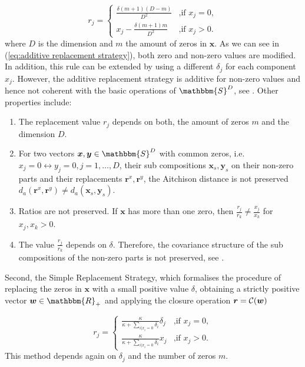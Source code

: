 \begin{equation}
r_j = 
\begin{cases}
\frac{\delta(m+1)(D-m)}{D^2} & \text{,if } x_j=0, \\
x_j - \frac{\delta(m+1)m}{D^2} & \text{,if } x_j>0.
\end{cases}
\label{eq:additive replacement strategy}
\end{equation}
%
where $D$ is the dimension and $m$ the amount of zeros in $\bm{x}$. 
As we can see in (\ref{eq:additive replacement strategy}), both zero and non-zero values are modified. In addition, this rule can be extended by using a different $\delta_j$ for each component $x_j$. However, the additive replacement strategy is additive for non-zero values and hence not coherent with the basic operations of $\mathbbm{S}^D$, see \textcite{Josep:2003}. Other properties include:

\begin{enumerate}
	\item The replacement value $r_j$ depends on both, the amount of zeros $m$ and the dimension $D$.
	\item For two vectors $\bm{x},\bm{y} \in \mathbbm{S}^D$ with common zeros, i.e. $x_j= 0 \leftrightarrow y_j=0, j=1,\ldots,D$, their sub compositions $\bm{x}_s,\bm{y}_s$  on their non-zero parts and their replacements $\bm{r}^x,\bm{r}^y$, the Aitchison distance is not preserved $d_a(\bm{r}^x,\bm{r}^y) \neq d_a(\bm{x}_s,\bm{y}_s)$. 
	\item Ratios are not preserved. If $\bm{x}$ has more than one zero, then $\frac{r_j}{r_k} \neq \frac{x_j}{x_k}$ for $x_j,x_k > 0$.
	\item The value $\frac{r_j}{r_k}$ depends on $\delta$. Therefore, the covariance structure of the sub compositions of the non-zero parts is not preserved, see \textcite{Josep:2003}.
\end{enumerate}

Second, the Simple Replacement Strategy, which formalises the procedure of replacing the zeros in $\bm{x}$ with a small positive value $\delta$, obtaining a strictly positive vector $\bm{w} \in \mathbbm{R}_+$ and applying the closure operation $\bm{r}=\mathcal{C}(\bm{w})$

\begin{equation}
r_j = 
\begin{cases}
\frac{\kappa}{\kappa + \sum_{i| x_i=0}\delta_i } \delta_j & \text{,if } x_j=0, \\
\frac{\kappa}{\kappa + \sum_{i| x_i=0}\delta_i } x_j & \text{,if } x_j>0.
\end{cases}
\label{eq:simple replacement strategy}
\end{equation}
%
This method depends again on $\delta_j$ and the number of zeros $m$. 

